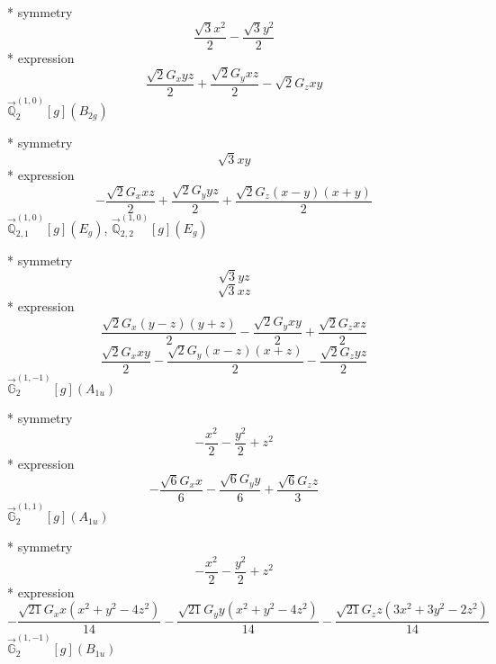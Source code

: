 \documentclass[fleqn,8pt]{jsarticle}
\begin{document}
\noindent\quad ** symmetry
\begin{dmath*}
\frac{\sqrt{3} x^{2}}{2} - \frac{\sqrt{3} y^{2}}{2}
\end{dmath*}
\noindent\quad ** expression
\begin{dmath*}
\frac{\sqrt{2} G_{x} y z}{2} + \frac{\sqrt{2} G_{y} x z}{2} - \sqrt{2} G_{z} x y
\end{dmath*}
\noindent\quad $\vec{\mathbb{Q}}_{2}^{(1,0)}[g](B_{2g})$

\noindent\quad ** symmetry
\begin{dmath*}
\sqrt{3} x y
\end{dmath*}
\noindent\quad ** expression
\begin{dmath*}
- \frac{\sqrt{2} G_{x} x z}{2} + \frac{\sqrt{2} G_{y} y z}{2} + \frac{\sqrt{2} G_{z} \left(x - y\right) \left(x + y\right)}{2}
\end{dmath*}
\noindent\quad $\vec{\mathbb{Q}}_{2,1}^{(1,0)}[g](E_{g})$, $\vec{\mathbb{Q}}_{2,2}^{(1,0)}[g](E_{g})$

\noindent\quad ** symmetry
\begin{dmath*}
\sqrt{3} y z
\end{dmath*}
\begin{dmath*}
\sqrt{3} x z
\end{dmath*}
\noindent\quad ** expression
\begin{dmath*}
\frac{\sqrt{2} G_{x} \left(y - z\right) \left(y + z\right)}{2} - \frac{\sqrt{2} G_{y} x y}{2} + \frac{\sqrt{2} G_{z} x z}{2}
\end{dmath*}
\begin{dmath*}
\frac{\sqrt{2} G_{x} x y}{2} - \frac{\sqrt{2} G_{y} \left(x - z\right) \left(x + z\right)}{2} - \frac{\sqrt{2} G_{z} y z}{2}
\end{dmath*}
\noindent\quad $\vec{\mathbb{G}}_{2}^{(1,-1)}[g](A_{1u})$

\noindent\quad ** symmetry
\begin{dmath*}
- \frac{x^{2}}{2} - \frac{y^{2}}{2} + z^{2}
\end{dmath*}
\noindent\quad ** expression
\begin{dmath*}
- \frac{\sqrt{6} G_{x} x}{6} - \frac{\sqrt{6} G_{y} y}{6} + \frac{\sqrt{6} G_{z} z}{3}
\end{dmath*}
\noindent\quad $\vec{\mathbb{G}}_{2}^{(1,1)}[g](A_{1u})$

\noindent\quad ** symmetry
\begin{dmath*}
- \frac{x^{2}}{2} - \frac{y^{2}}{2} + z^{2}
\end{dmath*}
\noindent\quad ** expression
\begin{dmath*}
- \frac{\sqrt{21} G_{x} x \left(x^{2} + y^{2} - 4 z^{2}\right)}{14} - \frac{\sqrt{21} G_{y} y \left(x^{2} + y^{2} - 4 z^{2}\right)}{14} - \frac{\sqrt{21} G_{z} z \left(3 x^{2} + 3 y^{2} - 2 z^{2}\right)}{14}
\end{dmath*}
\noindent\quad $\vec{\mathbb{G}}_{2}^{(1,-1)}[g](B_{1u})$
\end{document}
